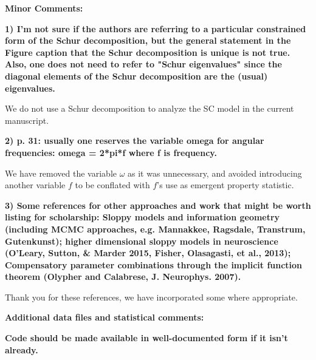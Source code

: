 \documentclass[11pt,a4paper]{article}
\begin{document}
\textbf{Minor Comments: }

\textbf{1) I'm not sure if the authors are referring to a particular constrained form of the Schur decomposition, but the general statement in the Figure caption that the Schur decomposition is unique is not true. Also, one does not need to refer to "Schur eigenvalues" since the diagonal elements of the Schur decomposition are the (usual) eigenvalues. }

We do not use a Schur decomposition to analyze the SC model in the current manuscript.

\textbf{2) p. 31: usually one reserves the variable omega for angular frequencies: omega = 2*pi*f where f is frequency. }

We have removed the variable $\omega$ as it was unnecessary, and avoided introducing another variable $f$ to be conflated with $f$'s use as emergent property statistic.

\textbf{3) Some references for other approaches and work that might be worth listing for scholarship: Sloppy models and information geometry (including MCMC approaches, e.g. Mannakkee, Ragsdale, Transtrum, Gutenkunst); higher dimensional sloppy models in neuroscience (O'Leary, Sutton, \& Marder 2015, Fisher, Olasagasti, et al., 2013); Compensatory parameter combinations through the implicit function theorem (Olypher and Calabrese, J. Neurophys. 2007). }

Thank you for these references, we have incorporated some where appropriate.

\textbf{Additional data files and statistical comments:}

\textbf{Code should be made available in well-documented form if it isn't already. }
\end{document}
